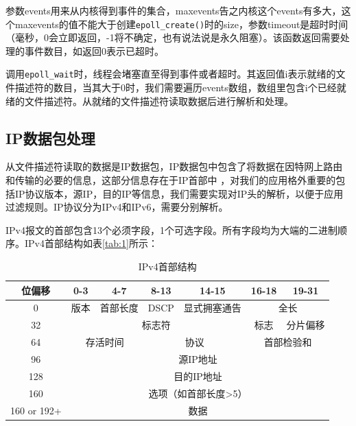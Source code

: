 \documentclass[format=final, language=chinese, degree=fyp]{hustthesis}
\begin{document}
\begin{enumerate}
参数events用来从内核得到事件的集合，maxevents告之内核这个events有多大，这个maxevents的值不能大于创建\verb|epoll_create()|时的size，参数timeout是超时时间（毫秒，0会立即返回，-1将不确定，也有说法说是永久阻塞）。该函数返回需要处理的事件数目，如返回0表示已超时。

调用\verb|epoll_wait|时，线程会堵塞直至得到事件或者超时。其返回值i表示就绪的文件描述符的数目，当其大于0时，我们需要遍历events数组，数组里包含i个已经就绪的文件描述符。从就绪的文件描述符读取数据后进行解析和处理。
\end{enumerate}

\subsection{IP数据包处理}


从文件描述符读取的数据是IP数据包，IP数据包中包含了将数据在因特网上路由和传输的必要的信息，这部分信息存在于IP首部中
，对我们的应用格外重要的包括IP协议版本，源IP，目的IP等信息，我们需要实现对IP头的解析，以便于应用过滤规则。IP协议分为IPv4和IPv6，需要分别解析。

IPv4报文的首部包含13个必须字段，1个可选字段。所有字段均为大端的二进制顺序。IPv4首部结构如表\autoref{tab:1}所示：

\begin{table}[h!]
\centering
\caption{IPv4首部结构}\label{tab:1}
\begin{tabular}{|c|c|c|c|c|c|c|}
	\hline
	位偏移 & 0-3 & 4-7 & 8-13 & 14-15 & 16-18 & 19-31\\
	\hline
	0 & 版本 & 首部长度 & DSCP & 显式拥塞通告 & \multicolumn{2}{c|}{全长}\\
	\hline
	32 & \multicolumn{4}{c|}{标志符} & 标志 & 分片偏移 \\
	\hline
	64 & \multicolumn{2}{c|}{存活时间}& \multicolumn{2}{c|}{协议}& \multicolumn{2}{c|}{首部检验和} \\
	\hline
	96 & \multicolumn{6}{c|}{源IP地址} \\
	\hline
	128 & \multicolumn{6}{c|}{目的IP地址} \\
	\hline
	160 & \multicolumn{6}{c|}{选项（如首部长度>5）} \\
	\hline
	160 or 192+ & \multicolumn{6}{c|}{数据}\\
	\hline
\end{tabular}
\end{table}
\end{document}
